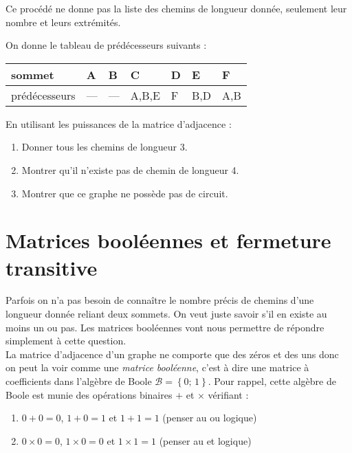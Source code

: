 \documentclass[a4paper,12pt]{book}
\begin{document}
\begin{remarque}[]
Ce procédé ne donne pas la liste des chemins de longueur donnée, seulement leur nombre et leurs extrémités.
\end{remarque}

\begin{exercice}[]
On donne le tableau de prédécesseurs suivants :
\begin{center}
\begin{tabular}{|l|>{\centering\arraybackslash}p{1cm}|>{\centering\arraybackslash}p{1cm}|>{\centering\arraybackslash}p{1cm}|>{\centering\arraybackslash}p{1cm}|>{\centering\arraybackslash}p{1cm}|>{\centering\arraybackslash}p{1cm}|}
\hline
sommet		 	& A 	& B 	& C 	& D 	& E 	& F\\
\hline
prédécesseurs 	& --- 	& --- 	& A,B,E & F 	& B,D   & A,B\\
\hline
\end{tabular}
\end{center}
En utilisant les puissances de la matrice d'adjacence :
\begin{enumerate}[--]
	\item 	Donner tous les chemins de longueur 3.
	\item 	Montrer qu'il n'existe pas de chemin de longueur 4.
	\item 	Montrer que ce graphe ne possède pas de circuit.
\end{enumerate}
\end{exercice}

\section{Matrices booléennes et fermeture transitive}


Parfois on n'a pas besoin de connaître le nombre précis de chemins d'une longueur donnée reliant deux sommets. On veut juste savoir s'il en existe au moins un ou pas. Les matrices booléennes vont nous permettre de répondre simplement à cette question.\\


La matrice d'adjacence d'un graphe ne comporte que des zéros et des uns donc on peut la voir comme une \textit{matrice booléenne}, c'est à dire une matrice à coefficients dans l'algèbre de Boole $\mathcal{B}=\left\{ 0;\,1\right\}$. Pour rappel, cette algèbre de Boole est munie des opérations binaires $+$ et $\times$ vérifiant :
\begin{enumerate}[\textbullet]
	\item 	$0+0 = 0$, $1+0 = 1$ et $1+1 = 1$ (penser au \og ou\fg{} logique)
	\item 	$0\times 0=0$, $1\times 0=0$ et $1\times 1 = 1$ (penser au \og et\fg{} logique)
\end{enumerate}
\end{document}
